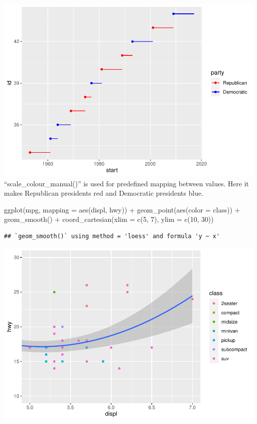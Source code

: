 \documentclass[
]{article}
\newenvironment{Shaded}{\begin{snugshade}}{\end{snugshade}}
\newcommand{\AttributeTok}[1]{\textcolor[rgb]{0.77,0.63,0.00}{#1}}
\newcommand{\DecValTok}[1]{\textcolor[rgb]{0.00,0.00,0.81}{#1}}
\newcommand{\FunctionTok}[1]{\textcolor[rgb]{0.00,0.00,0.00}{#1}}
\newcommand{\NormalTok}[1]{#1}
\newcommand{\SpecialCharTok}[1]{\textcolor[rgb]{0.00,0.00,0.00}{#1}}
\begin{document}
\includegraphics{Assignments_files/figure-latex/unnamed-chunk-68-1.pdf}
``scale\_colour\_manual()'' is used for predefined mapping between
values. Here it makes Republican presidents red and Democratic
presidents blue.

\begin{Shaded}
\begin{Highlighting}[]
\FunctionTok{ggplot}\NormalTok{(mpg, }\AttributeTok{mapping =} \FunctionTok{aes}\NormalTok{(displ, hwy)) }\SpecialCharTok{+}
  \FunctionTok{geom\_point}\NormalTok{(}\FunctionTok{aes}\NormalTok{(}\AttributeTok{color =}\NormalTok{ class)) }\SpecialCharTok{+}
  \FunctionTok{geom\_smooth}\NormalTok{() }\SpecialCharTok{+}
  \FunctionTok{coord\_cartesian}\NormalTok{(}\AttributeTok{xlim =} \FunctionTok{c}\NormalTok{(}\DecValTok{5}\NormalTok{, }\DecValTok{7}\NormalTok{), }\AttributeTok{ylim =} \FunctionTok{c}\NormalTok{(}\DecValTok{10}\NormalTok{, }\DecValTok{30}\NormalTok{))}
\end{Highlighting}
\end{Shaded}

\begin{verbatim}
## `geom_smooth()` using method = 'loess' and formula 'y ~ x'
\end{verbatim}

\includegraphics{Assignments_files/figure-latex/unnamed-chunk-69-1.pdf}
\end{document}
